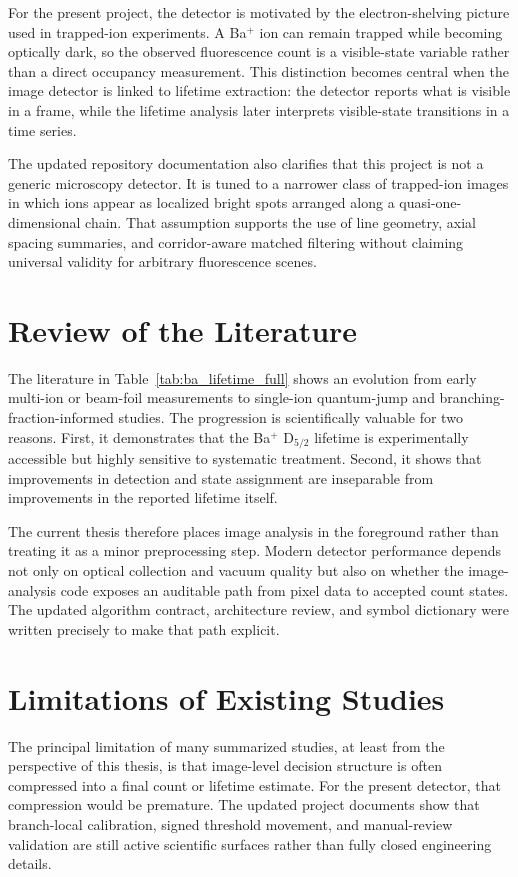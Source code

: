 \documentclass[12pt]{report}
\begin{document}
For the present project, the detector is motivated by the electron-shelving picture used in trapped-ion experiments. A Ba$^+$ ion can remain trapped while becoming optically dark, so the observed fluorescence count is a visible-state variable rather than a direct occupancy measurement. This distinction becomes central when the image detector is linked to lifetime extraction: the detector reports what is visible in a frame, while the lifetime analysis later interprets visible-state transitions in a time series.

The updated repository documentation also clarifies that this project is not a generic microscopy detector. It is tuned to a narrower class of trapped-ion images in which ions appear as localized bright spots arranged along a quasi-one-dimensional chain. That assumption supports the use of line geometry, axial spacing summaries, and corridor-aware matched filtering without claiming universal validity for arbitrary fluorescence scenes.

\section{Review of the Literature}

The literature in Table~\ref{tab:ba_lifetime_full} shows an evolution from early multi-ion or beam-foil measurements to single-ion quantum-jump and branching-fraction-informed studies. The progression is scientifically valuable for two reasons. First, it demonstrates that the Ba$^+$ D$_{5/2}$ lifetime is experimentally accessible but highly sensitive to systematic treatment. Second, it shows that improvements in detection and state assignment are inseparable from improvements in the reported lifetime itself.

The current thesis therefore places image analysis in the foreground rather than treating it as a minor preprocessing step. Modern detector performance depends not only on optical collection and vacuum quality but also on whether the image-analysis code exposes an auditable path from pixel data to accepted count states. The updated algorithm contract, architecture review, and symbol dictionary were written precisely to make that path explicit.

\section{Limitations of Existing Studies}

The principal limitation of many summarized studies, at least from the perspective of this thesis, is that image-level decision structure is often compressed into a final count or lifetime estimate. For the present detector, that compression would be premature. The updated project documents show that branch-local calibration, signed threshold movement, and manual-review validation are still active scientific surfaces rather than fully closed engineering details.
\end{document}
